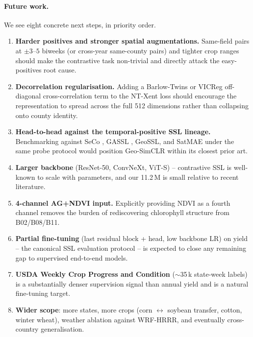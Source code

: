 \documentclass{article}
\begin{document}
\paragraph{Future work.} We see eight concrete next steps, in priority order.
\begin{enumerate}\itemsep0pt
\item \textbf{Harder positives and stronger spatial augmentations.} Same-field
      pairs at $\pm 3$--$5$ biweeks (or cross-year same-county pairs) and
      tighter crop ranges should make the contrastive task non-trivial and
      directly attack the easy-positives root cause.
\item \textbf{Decorrelation regularisation.} Adding a Barlow-Twins
      \citep{zbontar2021barlow} or VICReg \citep{bardes2022vicreg}
      off-diagonal cross-correlation term to the NT-Xent loss should encourage
      the representation to spread across the full 512 dimensions rather than
      collapsing onto county identity.
\item \textbf{Head-to-head against the temporal-positive SSL lineage.}
      Benchmarking against SeCo \citep{manas2021seco}, GASSL
      \citep{ayush2021gassl}, GeoSSL, and SatMAE \citep{cong2022satmae} under
      the same probe protocol would position Geo-SimCLR within its closest
      prior art.
\item \textbf{Larger backbone} (ResNet-50, ConvNeXt, ViT-S) -- contrastive SSL
      is well-known to scale with parameters, and our 11.2\,M is small relative
      to recent literature.
\item \textbf{4-channel AG+NDVI input.} Explicitly providing NDVI as a fourth
      channel removes the burden of rediscovering chlorophyll structure from
      B02/B08/B11.
\item \textbf{Partial fine-tuning} (last residual block + head, low backbone
      LR) on yield -- the canonical SSL evaluation protocol -- is expected to
      close any remaining gap to supervised end-to-end models.
\item \textbf{USDA Weekly Crop Progress and Condition} ($\sim$35\,k state-week
      labels) is a substantially denser supervision signal than annual yield
      and is a natural fine-tuning target.
\item \textbf{Wider scope}: more states, more crops (corn $\leftrightarrow$
      soybean transfer, cotton, winter wheat), weather ablation against
      WRF-HRRR, and eventually cross-country generalisation.
\end{enumerate}
\end{document}
